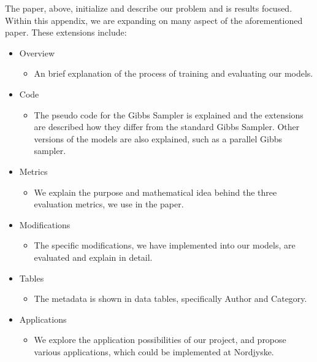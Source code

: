 The paper, above, initialize and describe our problem and is results focused.
Within this appendix, we are expanding on many aspect of the aforementioned paper.
These extensions include:
\begin{itemize}
	\item Overview
	\begin{itemize}
		\item An brief explanation of the process of training and evaluating our models.
	\end{itemize}
	\item Code
	\begin{itemize}
		\item The pseudo code for the Gibbs Sampler is explained and the extensions are described how they differ from the standard Gibbs Sampler. 
		Other versions of the models are also explained, such as a parallel Gibbs sampler.
	\end{itemize}
	\item Metrics 
	\begin{itemize}
		\item We explain the purpose and mathematical idea behind the three evaluation metrics, we use in the paper.
	\end{itemize}
	\item Modifications 
	\begin{itemize}
		\item The specific modifications, we have implemented into our models, are evaluated and explain in detail.
	\end{itemize}
	\item Tables
	\begin{itemize}
		\item The metadata is shown in data tables, specifically Author and Category.
	\end{itemize}
	\item Applications
	\begin{itemize}
		\item We explore the application possibilities of our project, and propose various applications, which could be implemented at Nordjyske.
	\end{itemize}
\end{itemize}